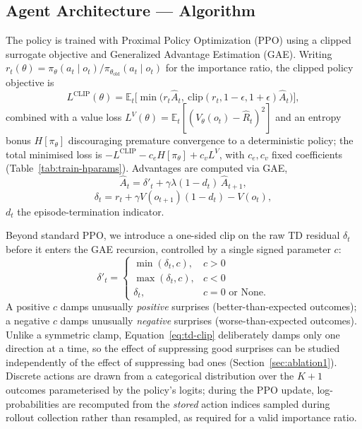 \documentclass[10pt,twocolumn]{article}
\begin{document}
\subsection{Agent Architecture --- Algorithm}
\label{sec:algorithm}

The policy is trained with Proximal Policy Optimization (PPO) using a clipped surrogate objective and Generalized Advantage Estimation (GAE). Writing $r_t(\theta)=\pi_\theta(a_t\mid o_t)/\pi_{\theta_{\text{old}}}(a_t\mid o_t)$ for the importance ratio, the clipped policy objective is
\begin{equation}
L^{\text{CLIP}}(\theta) = \mathbb{E}_t\Big[\min\big(r_t\hat A_t,\ \text{clip}(r_t,1{-}\epsilon,1{+}\epsilon)\hat A_t\big)\Big],
\end{equation}
combined with a value loss $L^{V}(\theta)=\mathbb{E}_t[(V_\theta(o_t)-\hat R_t)^2]$ and an entropy bonus $H[\pi_\theta]$ discouraging premature convergence to a deterministic policy; the total minimised loss is $-L^{\text{CLIP}} - c_e H[\pi_\theta] + c_v L^{V}$, with $c_e,c_v$ fixed coefficients (Table~\ref{tab:train-hparams}). Advantages are computed via GAE,
\begin{equation}
\hat A_t = \delta'_t + \gamma\lambda(1-d_t)\,\hat A_{t+1},
\label{eq:gae}
\end{equation}
\begin{equation}
\delta_t = r_t + \gamma V(o_{t+1})(1-d_t) - V(o_t),
\label{eq:td-residual}
\end{equation}
$d_t$ the episode-termination indicator.

Beyond standard PPO, we introduce a one-sided clip on the raw TD residual $\delta_t$ before it enters the GAE recursion, controlled by a single signed parameter $c$:
\begin{equation}
\delta'_t =
\begin{cases}
\min(\delta_t,c), & c>0 \\
\max(\delta_t,c), & c<0 \\
\delta_t, & c=0 \text{ or None.}
\end{cases}
\label{eq:td-clip}
\end{equation}
A positive $c$ damps unusually \emph{positive} surprises (better-than-expected outcomes); a negative $c$ damps unusually \emph{negative} surprises (worse-than-expected outcomes). Unlike a symmetric clamp, Equation~\eqref{eq:td-clip} deliberately damps only one direction at a time, so the effect of suppressing good surprises can be studied independently of the effect of suppressing bad ones (Section~\ref{sec:ablation1}). Discrete actions are drawn from a categorical distribution over the $K{+}1$ outcomes parameterised by the policy's logits; during the PPO update, log-probabilities are recomputed from the \emph{stored} action indices sampled during rollout collection rather than resampled, as required for a valid importance ratio.
\end{document}
